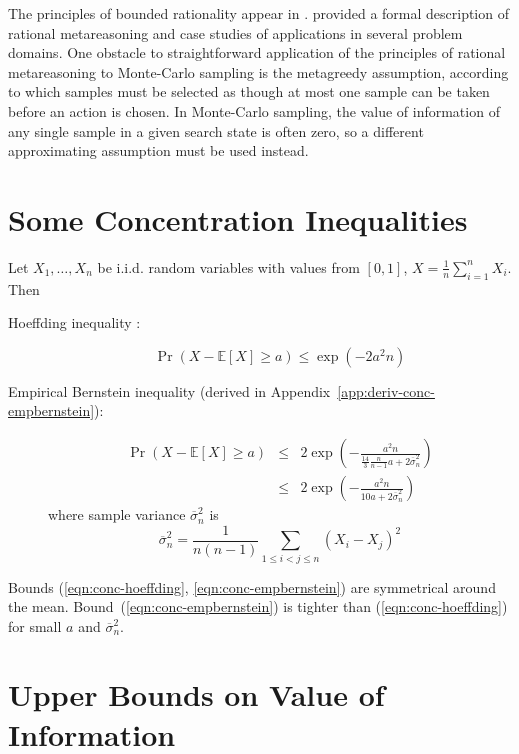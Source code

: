 \documentclass{article}
\newcommand {\IE} {\ensuremath {\mathbb{E}}}
\begin{document}
The principles of bounded rationality appear in
\cite{Horvitz.reasoningabout}. \cite{Russell.right} provided a formal
description of rational metareasoning and case studies of applications
in several problem domains. One obstacle to straightforward
application of the principles of rational metareasoning to Monte-Carlo
sampling is the metagreedy assumption, according to which samples must
be selected as though at most one sample can be taken before an action
is chosen. In Monte-Carlo sampling, the value of information of any
single sample in a given search state is often zero, so a different
approximating assumption must be used instead.

\section{Some Concentration Inequalities}

Let $X_1, \ldots, X_n$ be i.i.d. random variables with values from $[0,1]$,
$X=\frac 1 n \sum_{i=1}^n X_i$. Then 
\begin{description}
\item[Hoeffding inequality \rm{\cite{Hoeffding.ineq}}:] 
\begin{equation}
\Pr(X-\IE[X] \ge a) \le \exp ( -2a^2n)
\label{eqn:conc-hoeffding}
\end{equation}
\item[Empirical Bernstein inequality \rm{(derived in Appendix~\ref{app:deriv-conc-empbernstein})}:]
\begin{eqnarray}
\Pr(X-\IE[X] \ge a) &\le& 2\exp \left( - \frac {a^2n} {\frac {14} {3}
                          \frac {n} {n-1}a+2\overline\sigma_n^2}\right)\nonumber\\
                    &\le& 2\exp \left( - \frac {a^2n} {10a+2\overline\sigma_n^2}\right)
\label{eqn:conc-empbernstein}
\end{eqnarray}
where sample variance $\overline\sigma_n^2$ is
\begin{equation}
\overline\sigma_n^2=\frac 1 {n(n-1)} \sum_{1\le i < j\le n}(X_i-X_j)^2
\label{eqn:sample-variance}
\end{equation}
\end{description}
Bounds (\ref{eqn:conc-hoeffding}, \ref{eqn:conc-empbernstein}) are symmetrical
around the mean. Bound~(\ref{eqn:conc-empbernstein}) is tighter than
(\ref{eqn:conc-hoeffding}) for small $a$ and $\overline\sigma_n^2$. 

\section{Upper Bounds on Value of Information}
\end{document}

